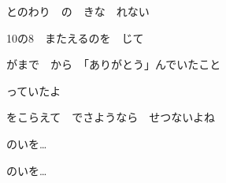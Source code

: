 \documentclass[14pt]{ltjsarticle}
\begin{document}
{\item
  とのわり　の　きな　れない
  \jisho{}

  10の8　またえるのを　じて
  \jisho{}

  がまで　から　「ありがとう」んでいたこと
  \jisho{}

  っていたよ
  \jisho{}

  をこらえて　でさようなら　せつないよね
  \jisho{}

  のいを…
  \jisho{}

\item
  のいを…
  \jisho{}

  
}
\end{document}

